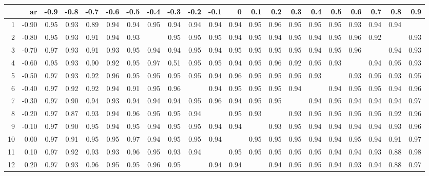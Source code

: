 \begin{table}[ht]
\centering
\begin{tabular}{rrrrrrrrrrrrrrrrrrrrr}
  \hline
 & ar & -0.9 & -0.8 & -0.7 & -0.6 & -0.5 & -0.4 & -0.3 & -0.2 & -0.1 & 0 & 0.1 & 0.2 & 0.3 & 0.4 & 0.5 & 0.6 & 0.7 & 0.8 & 0.9 \\ 
  \hline
1 & -0.90 & 0.95 & 0.93 & 0.89 & 0.94 & 0.94 & 0.95 & 0.94 & 0.94 & 0.94 & 0.94 & 0.95 & 0.96 & 0.95 & 0.95 & 0.95 & 0.93 & 0.94 & 0.94 &  \\ 
  2 & -0.80 & 0.95 & 0.93 & 0.91 & 0.94 & 0.93 &  & 0.95 & 0.95 & 0.95 & 0.94 & 0.95 & 0.94 & 0.95 & 0.94 & 0.95 & 0.96 & 0.92 &  & 0.93 \\ 
  3 & -0.70 & 0.97 & 0.93 & 0.91 & 0.93 & 0.95 & 0.94 & 0.94 & 0.95 & 0.94 & 0.95 & 0.95 & 0.95 & 0.95 & 0.94 & 0.95 & 0.96 &  & 0.94 & 0.93 \\ 
  4 & -0.60 & 0.95 & 0.93 & 0.90 & 0.92 & 0.95 & 0.97 & 0.51 & 0.95 & 0.95 & 0.94 & 0.95 & 0.96 & 0.92 & 0.95 & 0.93 &  & 0.94 & 0.95 & 0.93 \\ 
  5 & -0.50 & 0.97 & 0.93 & 0.92 & 0.96 & 0.95 & 0.95 & 0.95 & 0.95 & 0.94 & 0.96 & 0.95 & 0.95 & 0.95 & 0.93 &  & 0.93 & 0.95 & 0.93 & 0.95 \\ 
  6 & -0.40 & 0.97 & 0.92 & 0.92 & 0.94 & 0.91 & 0.95 & 0.96 &  & 0.94 & 0.95 & 0.95 & 0.95 & 0.94 &  & 0.94 & 0.95 & 0.95 & 0.94 & 0.96 \\ 
  7 & -0.30 & 0.97 & 0.90 & 0.94 & 0.93 & 0.94 & 0.94 & 0.94 & 0.95 & 0.96 & 0.94 & 0.95 & 0.95 &  & 0.94 & 0.95 & 0.94 & 0.94 & 0.94 & 0.97 \\ 
  8 & -0.20 & 0.97 & 0.87 & 0.93 & 0.94 & 0.96 & 0.95 & 0.95 & 0.94 &  & 0.95 & 0.93 &  & 0.93 & 0.95 & 0.95 & 0.95 & 0.95 & 0.92 & 0.96 \\ 
  9 & -0.10 & 0.97 & 0.90 & 0.95 & 0.94 & 0.95 & 0.94 & 0.95 & 0.95 & 0.94 & 0.94 &  & 0.93 & 0.95 & 0.94 & 0.94 & 0.94 & 0.94 & 0.93 & 0.96 \\ 
  10 & 0.00 & 0.97 & 0.91 & 0.95 & 0.95 & 0.97 & 0.94 & 0.95 & 0.95 & 0.94 &  & 0.95 & 0.95 & 0.95 & 0.94 & 0.94 & 0.95 & 0.94 & 0.91 & 0.97 \\ 
  11 & 0.10 & 0.97 & 0.92 & 0.93 & 0.93 & 0.96 & 0.95 & 0.93 & 0.94 &  & 0.95 & 0.95 & 0.95 & 0.95 & 0.95 & 0.94 & 0.94 & 0.93 & 0.88 & 0.98 \\ 
  12 & 0.20 & 0.97 & 0.93 & 0.96 & 0.95 & 0.95 & 0.96 & 0.95 &  & 0.94 & 0.94 &  & 0.94 & 0.95 & 0.95 & 0.94 & 0.93 & 0.94 & 0.88 & 0.97 \\ 

\end{tabular}
\end{table}
